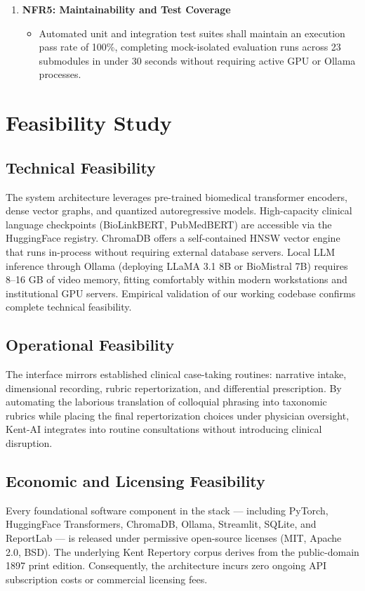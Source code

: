 \begin{enumerate}
  \item \textbf{NFR5: Maintainability and Test Coverage}
  \begin{itemize}
    \item Automated unit and integration test suites shall maintain an execution pass rate of 100\%, completing mock-isolated evaluation runs across 23 submodules in under 30 seconds without requiring active GPU or Ollama processes.
  \end{itemize}
\end{enumerate}


\section{Feasibility Study}

\subsection{Technical Feasibility}
The system architecture leverages pre-trained biomedical transformer encoders, dense vector graphs, and quantized autoregressive models. High-capacity clinical language checkpoints (BioLinkBERT, PubMedBERT) are accessible via the HuggingFace registry. ChromaDB offers a self-contained HNSW vector engine that runs in-process without requiring external database servers. Local LLM inference through Ollama (deploying LLaMA 3.1 8B or BioMistral 7B) requires 8--16 GB of video memory, fitting comfortably within modern workstations and institutional GPU servers. Empirical validation of our working codebase confirms complete technical feasibility.

\subsection{Operational Feasibility}
The interface mirrors established clinical case-taking routines: narrative intake, dimensional recording, rubric repertorization, and differential prescription. By automating the laborious translation of colloquial phrasing into taxonomic rubrics while placing the final repertorization choices under physician oversight, Kent-AI integrates into routine consultations without introducing clinical disruption.

\subsection{Economic and Licensing Feasibility}
Every foundational software component in the stack --- including PyTorch, HuggingFace Transformers, ChromaDB, Ollama, Streamlit, SQLite, and ReportLab --- is released under permissive open-source licenses (MIT, Apache 2.0, BSD). The underlying Kent Repertory corpus derives from the public-domain 1897 print edition. Consequently, the architecture incurs zero ongoing API subscription costs or commercial licensing fees.

